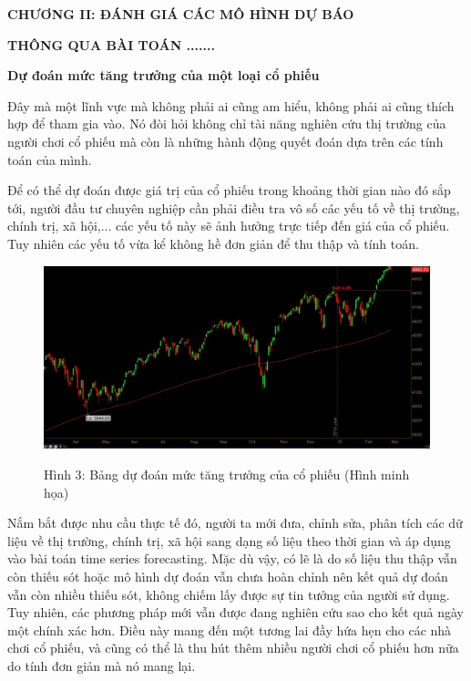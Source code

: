 \newpage
\changefontsizes{16pt}
\centerline{\textbf{CHƯƠNG II: ĐÁNH GIÁ CÁC MÔ HÌNH DỰ BÁO}}
\centerline{\textbf{THÔNG QUA BÀI TOÁN .......}}

\vspace{1cm}
\changefontsizes{15pt}
\setlength{\parindent}{0cm}
\textbf{Dự đoán mức tăng trưởng của một loại cổ phiếu}

\vspace{0.5cm}
\changefontsizes{13pt}
\setlength{\parindent}{0cm}


Đây mà một lĩnh vực mà không phải ai cũng am hiểu, không phải ai cũng thích hợp để tham gia vào. Nó đòi hỏi không chỉ tài năng nghiên cứu thị trường của người chơi cổ phiếu mà còn là những hành động quyết đoán dựa trên các tính toán của mình.

\bigskip
Để có thể dự đoán được giá trị của cổ phiếu trong khoảng thời gian nào đó sắp tới, người đầu tư chuyên nghiệp cần phải điều tra vô số các yếu tố về thị trường, chính trị, xã hội,... các yếu tố này sẽ ảnh hưởng trực tiếp đến giá của cổ phiếu. Tuy nhiên các yếu tố vừa kể không hề đơn giản để thu thập và tính toán.




\begin{center}
	\begin{figure}[htp]
		\begin{center}
			\includegraphics[scale=.3]{./images/stock.png}
		\end{center}
		\label{fig1}{Hình 3: Bảng dự đoán mức tăng trưởng của cổ phiếu (Hình minh họa)}
	\end{figure}
\end{center}


Nắm bắt được nhu cầu thực tế đó, người ta mới đưa, chỉnh sửa, phân tích các dữ liệu về thị trường, chính trị, xã hội sang dạng số liệu theo thời gian và áp dụng vào bài toán time series forecasting. Mặc dù vậy, có lẽ là do số liệu thu thập vẫn còn thiếu sót hoặc mô hình dự đoán vẫn chưa hoàn chỉnh nên kết quả dự đoán vẫn còn nhiều thiếu sót, không chiếm lấy được sự tin tưởng của người sử dụng. Tuy nhiên, các phương pháp mới vẫn được đang nghiên cứu sao cho kết quả ngày một chính xác hơn. Điều này mang đến một tương lai đầy hứa hẹn cho các nhà chơi cổ phiếu, và cũng có thể là thu hút thêm nhiều người chơi cổ phiếu hơn nữa do tính đơn giản mà nó mang lại.


